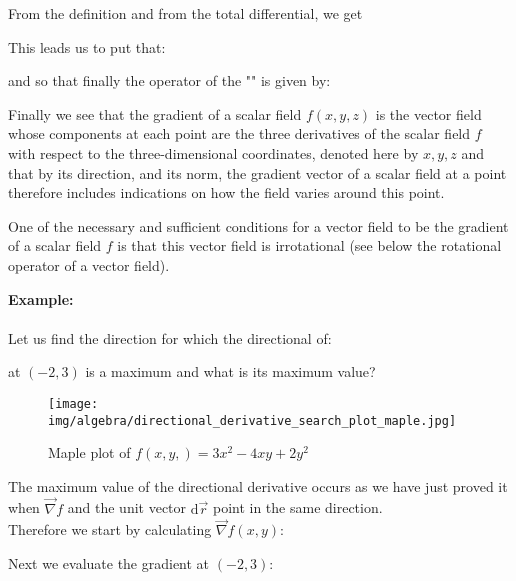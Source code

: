 	From the definition and from the total differential, we get
	
	This leads us to put that:
	
	and so that finally the operator of the "" is given by:
	
	Finally we see that the gradient of a scalar field $f(x,y,z)$ is the vector field whose components at each point are the three derivatives of the scalar field $f$ with respect to the three-dimensional coordinates, denoted here by $x, y, z$ and that by its direction, and its norm, the gradient vector of a scalar field at a point therefore includes indications on how the field varies around this point.
	
	\begin{tcolorbox}[title=Remark,colframe=black,arc=10pt]
	One of the necessary and sufficient conditions for a vector field to be the gradient of a scalar field $f$ is that this vector field is irrotational (see below the rotational operator of a vector field).
	\end{tcolorbox}
	\begin{tcolorbox}[colframe=black,colback=white,sharp corners]
	\textbf{{\Large {}}Example:}\\\\
	Let us find the direction for which the directional of:
	
	at $(-2,3)$ is a maximum and what is its maximum value?
	\begin{figure}[H]
		\centering
		\texttt{[image: img/algebra/directional\_derivative\_search\_plot\_maple.jpg]}
		\caption[]{Maple plot of $f(x,y,)=3x^2-4xy+2y^2$}
	\end{figure}
	The maximum value of the directional derivative occurs as we have just proved it when $\vec{\nabla}f$ and the unit vector $\mathrm{d}\vec{r}$ point in the same direction.\\

	Therefore we start by calculating $\vec{\nabla}f(x,y)$:
	
	Next we evaluate the gradient at $(-2,3)$:
	
	\end{tcolorbox}
